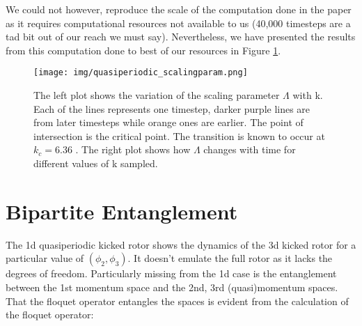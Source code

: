 \documentclass[twocolumn]{report}
\begin{document}
We could not however, reproduce the scale of the computation
done in the paper as it requires computational resources not
available to us (40,000 timesteps are a tad bit out of our reach
we must say). Nevertheless, we have presented the results
from this computation done to best of our resources in Figure
\ref{fig:scalingparam}.

\begin{figure}[t]
    \texttt{[image: img/quasiperiodic\_scalingparam.png]}
    \caption{The left plot shows the variation of the scaling parameter
    $\Lambda$ with k. Each of the lines represents one timestep, darker
    purple lines are from later timesteps while orange ones are earlier.
    The point of intersection is the critical point. The transition is known
    to occur at $k_c = 6.36$ \cite{lemarie_universality_2009}. The right plot
    shows how $\Lambda$ changes with time for different values of k sampled.}
    \label{fig:scalingparam}
\end{figure}

\section{Bipartite Entanglement}
The 1d quasiperiodic kicked rotor shows the dynamics of the 3d kicked
rotor for a particular value of $(\phi_2,\phi_3)$. It doesn't emulate
the full rotor as it lacks the degrees of freedom. Particularly missing
from the 1d case is the entanglement between the 1st momentum space and
the 2nd, 3rd (quasi)momentum spaces. That the floquet operator entangles
the spaces is evident from the calculation of the floquet operator:
\end{document}

